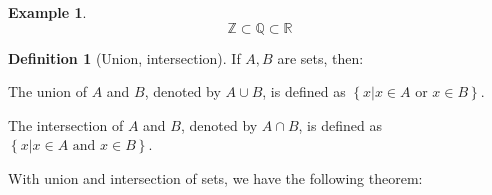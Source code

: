 \documentclass{article}
\theoremstyle{MyNonumberplain}
\theoremstyle{break}
\newcommand{\R}{\mathbb{R}}
\newcommand{\Q}{\mathbb{Q}}
\newcommand{\Z}{\mathbb{Z}}
\theoremstyle{break}
\newtheorem{example}{Example}[section]
\theoremstyle{break}
\theoremstyle{definition}
\theoremstyle{break}
\newtheorem{definition}{Definition}[section]
\begin{document}
\begin{expbox}
    \begin{example}
        $$\Z\subset\Q\subset\R$$
    \end{example}
\end{expbox}

\begin{defbox}
    \begin{definition}[Union, intersection]
        If $A,B$ are sets, then:\bigskip

        The union of $A$ and $B$, denoted by $A \cup B$, is defined as $\left\{ x|x \in A \text{ or } x \in B \right\}$. \bigskip
        
        The intersection of $A$ and $B$, denoted by $A \cap B$, is defined as $\left\{ x|x \in A \text{ and } x \in B \right\}$.            
    \end{definition}    
\end{defbox}

With union and intersection of sets, we have the following theorem:
\end{document}
